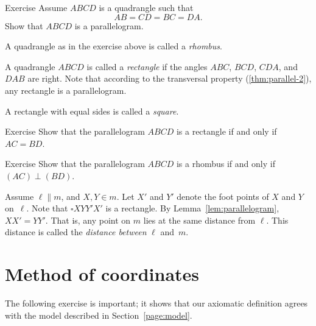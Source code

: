\begin{thm}{Exercise}\label{ex:romb}
Assume $ABCD$ is a quadrangle such that
\[AB=CD=BC=DA.\]
Show that $ABCD$ is a parallelogram.
\end{thm}

A quadrangle as in the exercise above is called a \emph{rhombus}.

A quadrangle $ABCD$ is called a \emph{rectangle} if the angles $ABC$, $BCD$, $CDA$, and $DAB$ are right.
Note that according to the transversal property (\ref{thm:parallel-2}),
any rectangle is a parallelogram.

A rectangle with equal sides is called a \emph{square}.

\begin{thm}{Exercise}\label{ex:rectangle}
Show that the parallelogram $ABCD$ is a rectangle
if and only if $AC=BD$.
\end{thm}

\begin{thm}{Exercise}\label{ex:romb2}
Show that the parallelogram $ABCD$ is a rhombus
if and only if $(AC)\perp (BD)$.
\end{thm}

Assume $\ell\parallel m$, and $X,Y\in m$.
Let $X'$ and $Y'$ denote the foot points of $X$ and $Y$ on~$\ell$.
Note that $\square XYY'X'$ is a rectangle.
By Lemma~\ref{lem:parallelogram}, $XX'=YY'$.
That is, any point on $m$ lies at the same distance from $\ell$.
This distance is called the \emph{distance between} $\ell$ and~$m$.


\section{Method of coordinates}

The following exercise is important;
it shows that our axiomatic definition agrees with the model described in Section~\ref{page:model}.


